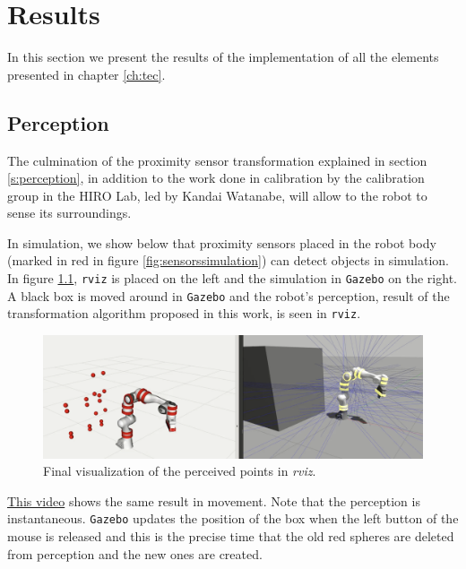 \chapter{Results}
\label{resultschap}

In this section we present the results of the implementation of all the elements presented in chapter \ref{ch:tec}.

\section{Perception}

The culmination of the proximity sensor transformation explained in section \ref{s:perception}, in addition to the work done in calibration by the calibration group in the HIRO Lab, led by Kandai Watanabe, will allow to the robot to sense its surroundings.

In simulation, we show below that proximity sensors placed in the robot body (marked in red in figure \ref{fig:sensorssimulation}) can detect objects in simulation. In figure \ref{fig:visualizationpoints}, \lstinline{rviz} is placed on the left and the simulation in \lstinline{Gazebo} on the right. A black box is moved around in \lstinline{Gazebo} and the robot's perception, result of the transformation algorithm proposed in this work, is seen in \lstinline{rviz}.


\begin{figure}[H]
    \caption[Spheres]{
    Final visualization of the perceived points in \textit{rviz}.
    }
    \begin{center}
    \includegraphics[width=\textwidth]{figs/visualizationpoints.png}
    \end{center}
\label{fig:visualizationpoints}
\end{figure}

\href{https://www.youtube.com/watch?v=nfT7xecq0Xo&list=PLnhdDYfKdsgimnQTQO-bmtKj-KRdbvGgS&index=2&t=0s}{This video} shows the same result in movement. Note that the perception is instantaneous. \lstinline{Gazebo} updates the position of the box when the left button of the mouse is released and this is the precise time that the old red spheres are deleted from perception and the new ones are created.

